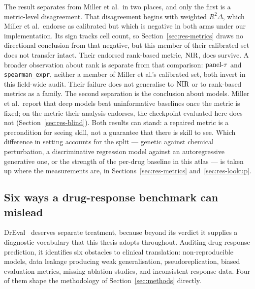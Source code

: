 The result separates from Miller et al.\ in two places, and only the first is a metric-level
disagreement. That disagreement begins with weighted $R^2\Delta$, which Miller et al.\ endorse as
calibrated but which is negative in both arms under our implementation. Its sign tracks cell count,
so Section~\ref{sec:res-metrics} draws no directional conclusion from that negative, but this member
of their calibrated set does not transfer intact. Their endorsed rank-based metric, $\textrm{NIR}$, does
survive. A broader observation about rank is separate from that comparison: $\textrm{panel-}\tau$ and
\texttt{spearman\_expr}, neither a member of Miller et al.'s calibrated set, both invert in this
field-wide audit. Their failure does not generalise to $\textrm{NIR}$ or to rank-based metrics as a family.
The second separation is the conclusion about models. Miller
et al.\ report that deep models beat uninformative baselines once the metric is fixed; on the metric
their analysis endorses, the checkpoint evaluated here does not
(Section~\ref{sec:res-blind}). Both results can stand: a repaired metric is a precondition for
seeing skill, not a guarantee that there is skill to see. Which difference in setting accounts for
the split --- genetic against chemical perturbation, a discriminative regression model against an
autoregressive generative one, or the strength of the per-drug baseline in this atlas --- is taken
up where the measurements are, in Sections~\ref{sec:res-metrics}
and~\ref{sec:res-lookup}.

\subsection{Six ways a drug-response benchmark can mislead}
\label{sec:lit-dreval}

DrEval~\cite{dreval} deserves separate treatment, because beyond its verdict it supplies a
diagnostic vocabulary that this thesis adopts throughout. Auditing drug response prediction, it
identifies six obstacles to clinical translation: non-reproducible models, data leakage producing
weak generalisation, pseudoreplication, biased evaluation metrics, missing ablation studies, and
inconsistent response data. Four of them shape the methodology of Section~\ref{sec:methods} directly.

